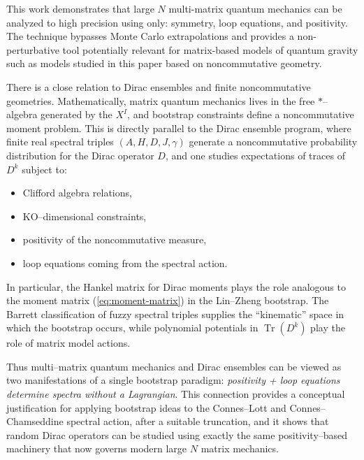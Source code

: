 \documentclass[11pt]{article}
\theoremstyle{plain}
\begin{document}
\noindent

This work demonstrates that large $N$ multi-matrix quantum mechanics can be
analyzed to high precision using only:
symmetry, loop equations, and positivity.  
The technique bypasses Monte Carlo extrapolations and provides a
non-perturbative tool potentially relevant for matrix-based models of
quantum gravity such as models  studied in this paper based on noncommutative geometry. 


\medskip 

There is a close relation  to Dirac ensembles and finite noncommutative geometries.
Mathematically, matrix quantum mechanics lives in the free $*$--algebra 
generated by the $X^I$, and bootstrap constraints define a 
noncommutative moment problem.  
This is directly parallel to the Dirac ensemble program, where 
finite real spectral triples $(A,H,D,J,\gamma)$ generate a 
noncommutative probability distribution for the Dirac operator $D$, and 
one studies expectations of traces of $D^k$ subject to:
\begin{itemize}
\item Clifford algebra relations,
\item KO--dimensional constraints,
\item positivity of the noncommutative measure,
\item loop equations coming from the spectral action.
\end{itemize}
In particular, the Hankel matrix for Dirac moments plays the role 
analogous to the moment matrix (\ref{eq:moment-matrix}) in the 
Lin--Zheng bootstrap.  The Barrett  classification of fuzzy 
spectral triples supplies the ``kinematic'' space in which the 
bootstrap occurs, while polynomial potentials in 
$\operatorname{Tr}(D^k)$ play the role of matrix model actions.  

Thus multi--matrix quantum mechanics and Dirac ensembles can be viewed 
as two manifestations of a single bootstrap paradigm:  
\emph{positivity + loop equations determine spectra without a Lagrangian}.  
This connection provides a conceptual justification for applying 
bootstrap ideas to the Connes--Lott and Connes--Chamseddine spectral 
action, after a suitable truncation,  and it shows that random Dirac operators can be studied using 
exactly the same positivity--based machinery that now governs modern 
large $N$ matrix mechanics.
\end{document}
